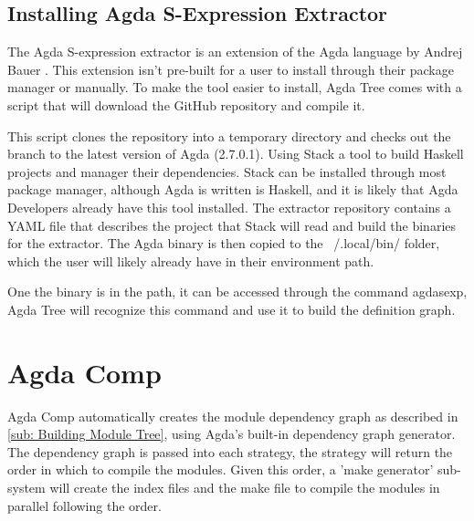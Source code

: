 \subsection{Installing Agda S-Expression Extractor}

The Agda S-expression extractor is an extension of the Agda language by Andrej
Bauer \cite{andrej}. This extension isn't pre-built for a user to install
through their package manager or manually. To make the tool easier to install,
Agda Tree comes with a script that will download the GitHub repository and
compile it. 

This script clones the repository into a temporary directory and checks out the
branch to the latest version of Agda (2.7.0.1). Using Stack a tool to build
Haskell projects and manager their dependencies. Stack can be installed through
most package manager, although Agda is written is Haskell, and it is likely that
Agda Developers already have this tool installed. The extractor repository
contains a YAML file that describes the project that Stack will read and build
the binaries for the extractor. The Agda binary is then copied to the
\textsf{~/.local/bin/} folder, which the user will likely already have in their
environment path. 

One the binary is in the path, it can be accessed through the command
\textsf{agdasexp}, Agda Tree will recognize this command and use it to build
the definition graph.


\section{Agda Comp}

Agda Comp automatically creates the module dependency graph as described in
\cref{sub: Building Module Tree}, using Agda's built-in dependency
graph generator. The dependency graph is passed into each strategy, the
strategy will return the order in which to compile the modules. Given this
order, a 'make generator' sub-system will create the index files and the make
file to compile the modules in parallel following the order.

